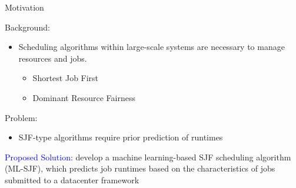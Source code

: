 \documentclass[unknownkeysallowed, final]{beamer}
\begin{document}
\begin{frame}
\vspace{-1.2cm}

\begin{columns}[t]
    
\begin{column}{.33\linewidth}

\begin{block}{Motivation}

Background:
\begin{itemize}
        \item Scheduling algorithms within large-scale systems are necessary to manage resources and jobs.
        \begin{itemize}
            \item Shortest Job First
		    \item Dominant Resource Fairness
        \end{itemize}
\end{itemize}

\vspace{.6cm}
\alert{Problem}:  \\
    \begin{itemize}
        \item SJF-type algorithms require prior prediction of runtimes
    \end{itemize}
\vspace{.6cm}
\textcolor{blue}{Proposed Solution:} develop a machine learning-based SJF scheduling algorithm (ML-SJF), which predicts job runtimes based on the characteristics of jobs submitted to a datacenter framework
\end{block}


\end{column}
\end{columns}
\end{frame}
\end{document}
